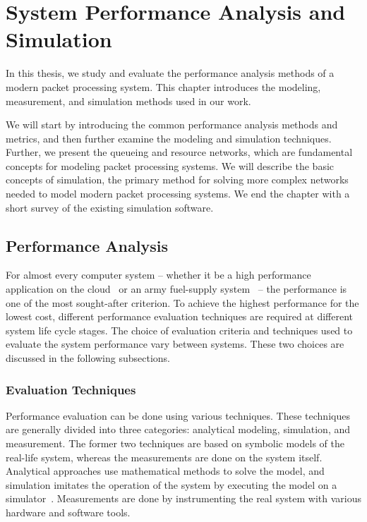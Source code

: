 \chapter{System Performance Analysis and Simulation}
\label{chapter:system-performance-analysis-and-simulation}
In this thesis, we study and evaluate the performance analysis methods of a modern packet processing system. This chapter introduces the modeling, measurement, and simulation methods used in our work.

We will start by introducing the common performance analysis methods and metrics, and then further examine the modeling and simulation techniques. Further, we present the queueing and resource networks, which are fundamental concepts for modeling packet processing systems. We will describe the basic concepts of simulation, the primary method for solving more complex networks needed to model modern packet processing systems. We end the chapter with a short survey of the existing simulation software.


\section{Performance Analysis}
For almost every computer system -- whether it be a high performance application on the cloud~\cite{jackson:2010:HPCOC} or an army fuel-supply system~\cite{sabuncuoglu:2005:TAS} -- the performance is one of the most sought-after criterion. To achieve the highest performance for the lowest cost, different performance evaluation techniques are required at different system life cycle stages. The choice of evaluation criteria and techniques used to evaluate the system performance vary between systems. These two choices are discussed in the following subsections.~\cite{jain:1991:AOCSPA}

\subsection{Evaluation Techniques}
Performance evaluation can be done using various techniques. These techniques are generally divided into three categories: analytical modeling, simulation, and measurement. The former two techniques are based on symbolic models of the real-life system, whereas the measurements are done on the system itself. Analytical approaches use mathematical methods to solve the model, and simulation imitates the operation of the system by executing the model on a simulator~\cite{Banks:2010:DES}. Measurements are done by instrumenting the real system with various hardware and software tools.~\cite{jain:1991:AOCSPA}

